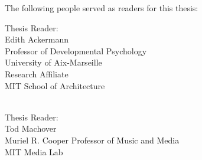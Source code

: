 \begin{titlepage}
      {\setlength{\parindent}{0cm}
        \large  


        \hfill







        \vfill        

        The following people served as readers for this thesis:
        \\ \bigskip

 

        Thesis Reader:\\
        Edith Ackermann\\
        Professor of Developmental Psychology\\
        University of Aix-Marseille\\
        Research Affiliate\\
        MIT School of Architecture\\
        \\ \bigskip

        Thesis Reader:\\
        Tod Machover\\
        Muriel R. Cooper Professor of Music and Media\\
        MIT Media Lab\\         

        


        





        }
\end{titlepage}   
